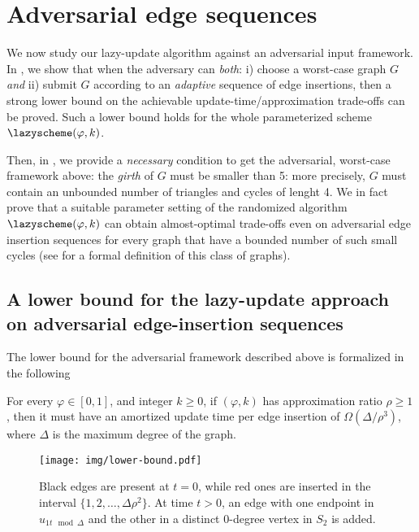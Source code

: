 \section{Adversarial edge  sequences}\label{sec:gammaok}



We now study our lazy-update algorithm against an adversarial input framework. In , we  show that when the adversary can \textit{both}: i) choose a worst-case  graph $G$ \textit{and}  ii)   submit $G$ according to an \textit{adaptive} sequence of edge insertions, then a strong lower bound on the achievable update-time/approximation trade-offs can be proved. Such a lower bound holds for the whole parameterized scheme $\lazyscheme (\varphi,k)$.

Then, in , we provide  a \textit{necessary} condition to get the adversarial, worst-case framework above: the \textit{girth} \cite{} of  $G$ must be smaller than 5: more precisely,  $G$ must contain an unbounded number of triangles and cycles of lenght 4.   We in fact prove that a suitable parameter setting of the randomized algorithm $\lazyscheme (\varphi,k)$ can obtain almost-optimal trade-offs even on adversarial edge insertion sequences for every graph that have a bounded number of such small cycles (see  for a formal definition of this class of graphs).

\subsection{A lower bound for the lazy-update approach on adversarial edge-insertion sequences} \label{ssec:lowerbound}
The lower bound for the adversarial framework described above is formalized in the following 


\begin{theorem}\label{thm:lower}
    For every $\varphi \in [0,1]$, and integer $k \geq 0$, if  \lazyscheme$(\varphi,k)$ has approximation ratio $\rho \ge 1$, then it must have an amortized update time per edge insertion of $\Omega(\Delta/\rho^3)$, where $\Delta$ is the maximum degree of the graph.
\end{theorem}\label{le:lb1}

\begin{figure}[ht]
    \centering
    \texttt{[image: img/lower-bound.pdf]}
    \caption{Black edges are present at $t = 0$, while red ones are inserted in the interval $\{1, 2,\ldots , \Delta \rho^2\}$. At time $t > 0$, an edge with one endpoint in $u_{1t\mod\Delta}$ and the other in a distinct 0-degree vertex in $S_2$ is added.}
    \label{fig:lb1}
\end{figure}

